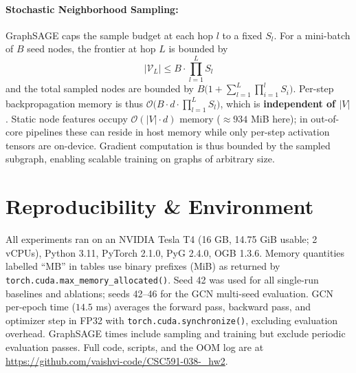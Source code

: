 \documentclass[10pt,twocolumn]{article}
\begin{document}
\paragraph{Stochastic Neighborhood Sampling:}
GraphSAGE caps the sample budget at each hop $l$ to a fixed $S_l$. For a
mini-batch of $B$ seed nodes, the frontier at hop $L$ is bounded by
\begin{equation}
  |\mathcal{V}_L| \le B \cdot \prod_{l=1}^L S_l
\end{equation}
and the total sampled nodes are bounded by $B\bigl(1+\sum_{l=1}^L \prod_{i=1}^l
S_i\bigr)$.  Per-step backpropagation memory is thus
$\mathcal{O}\!\bigl(B \cdot d \cdot \prod_{l=1}^L S_l\bigr)$, which is
\textbf{independent of $|V|$}.  Static node features occupy $\mathcal{O}(|V|{\cdot}d)$
memory ($\approx 934$ MiB here); in out-of-core pipelines these can reside in host
memory while only per-step activation tensors are on-device. Gradient computation
is thus bounded by the sampled subgraph, enabling scalable training on graphs of
arbitrary size.

\section{Reproducibility \& Environment}
All experiments ran on an NVIDIA Tesla T4 (16 GB, 14.75 GiB usable; 2 vCPUs),
Python 3.11, PyTorch 2.1.0, PyG 2.4.0, OGB 1.3.6. Memory quantities labelled
``MB'' in tables use binary prefixes (MiB) as returned by
\texttt{torch.cuda.max\_memory\_allocated()}. Seed 42 was used for all single-run
baselines and ablations; seeds 42--46 for the GCN multi-seed evaluation.
GCN per-epoch time ($14.5$ ms) averages the forward pass, backward pass, and
optimizer step in FP32 with \texttt{torch.cuda.synchronize()}, excluding
evaluation overhead. GraphSAGE times include sampling and training but exclude
periodic evaluation passes. Full code, scripts, and the OOM log are at
\url{https://github.com/vaishvi-code/CSC591-038-_hw2}.

\end{document}
